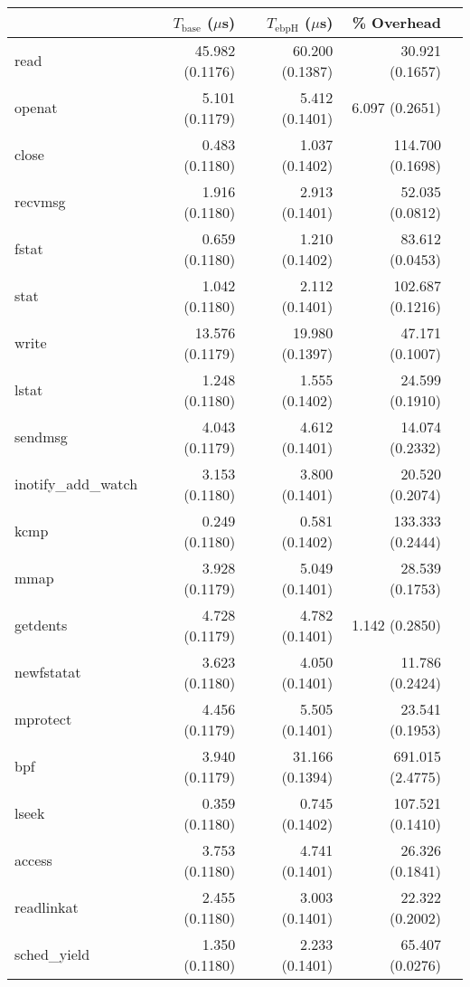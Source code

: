 \begin{tabular}{>{\ttfamily}lrrrr}
\toprule
\multicolumn{1}{l}{System Call} & $T_{\text{base}}$ ($\mu$s) & $T_{\text{ebpH}}$ ($\mu$s) &       \% Overhead \\
\midrule
                           read &            45.982 (0.1176) &            60.200 (0.1387) &   30.921 (0.1657) \\
                         openat &             5.101 (0.1179) &             5.412 (0.1401) &    6.097 (0.2651) \\
                          close &             0.483 (0.1180) &             1.037 (0.1402) &  114.700 (0.1698) \\
                        recvmsg &             1.916 (0.1180) &             2.913 (0.1401) &   52.035 (0.0812) \\
                          fstat &             0.659 (0.1180) &             1.210 (0.1402) &   83.612 (0.0453) \\
                           stat &             1.042 (0.1180) &             2.112 (0.1401) &  102.687 (0.1216) \\
                          write &            13.576 (0.1179) &            19.980 (0.1397) &   47.171 (0.1007) \\
                          lstat &             1.248 (0.1180) &             1.555 (0.1402) &   24.599 (0.1910) \\
                        sendmsg &             4.043 (0.1179) &             4.612 (0.1401) &   14.074 (0.2332) \\
            inotify\_add\_watch &             3.153 (0.1180) &             3.800 (0.1401) &   20.520 (0.2074) \\
                           kcmp &             0.249 (0.1180) &             0.581 (0.1402) &  133.333 (0.2444) \\
                           mmap &             3.928 (0.1179) &             5.049 (0.1401) &   28.539 (0.1753) \\
                       getdents &             4.728 (0.1179) &             4.782 (0.1401) &    1.142 (0.2850) \\
                     newfstatat &             3.623 (0.1180) &             4.050 (0.1401) &   11.786 (0.2424) \\
                       mprotect &             4.456 (0.1179) &             5.505 (0.1401) &   23.541 (0.1953) \\
                            bpf &             3.940 (0.1179) &            31.166 (0.1394) &  691.015 (2.4775) \\
                          lseek &             0.359 (0.1180) &             0.745 (0.1402) &  107.521 (0.1410) \\
                         access &             3.753 (0.1180) &             4.741 (0.1401) &   26.326 (0.1841) \\
                     readlinkat &             2.455 (0.1180) &             3.003 (0.1401) &   22.322 (0.2002) \\
                   sched\_yield &             1.350 (0.1180) &             2.233 (0.1401) &   65.407 (0.0276) \\
\bottomrule
\end{tabular}
